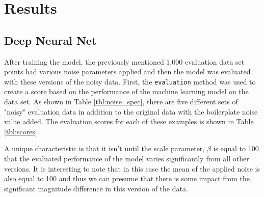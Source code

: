 \documentclass[conference]{IEEEtran}
\begin{document}
\section{Results}
\subsection{Deep Neural Net}

After training the model, the previously mentioned 1,000 evaluation data set points had various noise parameters applied and then the model was evaluated with these versions of the noisy data.
First, the \verb*|evaluation| method was used to create a score based on the performance of the machine learning model on the data set. 
As shown in Table \ref{tbl:noise_spec}, there are five different sets of "noisy" evaluation data in addition to the original data with the boilerplate noise value added. 
The evaluation scores for each of these examples is shown in Table \ref{tbl:scores}.
\begin{table}
	\centering
	\caption{Evaluated Data Scores Based on Standard Deviation of Noise.}
	\setlength\extrarowheight{2pt}
	\label{tbl:scores}
\end{table}

A unique characteristic is that it isn't until the scale parameter, $\beta$ is equal to 100 that the evaluated performance of the model varies significantly from all other versions. 
It is interesting to note that in this case the mean of the applied noise is also equal to 100 and thus we can presume that there is some impact from the significant magnitude difference in this version of the data.
\end{document}
